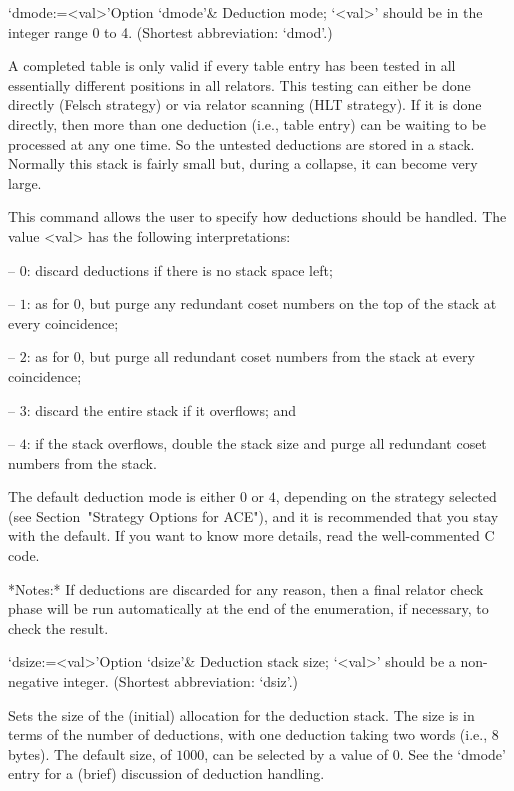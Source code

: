 \>`dmode:=<val>'{Option `dmode'}&
Deduction mode; `<val>' should be in the integer range 0 to 4.
(Shortest abbreviation: `dmod'.)

A completed table  is only valid if every table  entry has been tested
in all essentially different  positions in all relators.  This testing
can either be done directly  (Felsch strategy) or via relator scanning
(HLT strategy).  If it is  done directly, then more than one deduction
(i.e., table  entry) can be waiting  to be processed at  any one time.
So the untested deductions are stored in a stack.  Normally this stack
is fairly small but, during a collapse, it can become very large.

This command allows the user  to  specify  how  deductions  should  be
handled. The value <val> has the following interpretations:

\beginlist

\item{--} $0$:  
discard deductions if there is no stack space left;

\item{--} $1$: 
as for $0$, but purge any redundant coset numbers on the  top  of  the
stack at every coincidence;

\item{--} $2$: 
as for 0, but purge all redundant coset  numbers  from  the  stack  at
every coincidence;

\item{--} $3$:
discard the entire stack if it overflows; and

\item{--} $4$:
if the stack overflows, double the stack size and purge all  redundant
coset numbers from the stack.

\endlist

The default deduction mode is either $0$  or  $4$,  depending  on  the
strategy selected (see Section~"Strategy Options for ACE"), and it  is
recommended that you stay with the default. If you want to  know  more
details, read the well-commented C code.

*Notes:*
If deductions are discarded for any reason, then a final relator check
phase  will be run  automatically at  the end  of the  enumeration, if
necessary, to check the result.

\>`dsize:=<val>'{Option `dsize'}&
Deduction stack size; `<val>' should be a non-negative integer.
(Shortest abbreviation: `dsiz'.)

Sets the  size of  the (initial) allocation  for the  deduction stack.
The size is  in terms of the number of  deductions, with one deduction
taking two words (i.e., 8 bytes).  The default size, of $1000$, can be
selected  by  a value  of  0.   See the  `dmode' entry  for a  (brief)
discussion of deduction handling.

